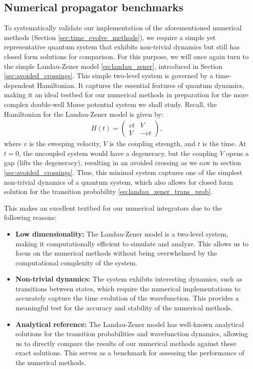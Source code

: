 \documentclass{subfiles}
\begin{document}
\subsection{Numerical propagator benchmarks}
To systematically validate our implementation of the aforementioned numerical methods (Section \ref{sec:time_evolve_methods}), we require a simple yet representative quantum system that exhibits non-trivial dynamics but still has closed form solutions for comparison. For this purpose, we will once again turn to the simple Landau-Zener model \eqref{eq:landau_zener}, introduced in Section \ref{sec:avoided_crossings}. This simple two-level system is governed by a time-dependent Hamiltonian. It captures the essential features of quantum dynamics, making it an ideal testbed for our numerical methods in preparation for the more complex double-well Morse potential system we shall study.
Recall, the Hamiltonian for the Landau-Zener model is given by:
\begin{align*}
    H(t) = \begin{pmatrix}
        vt & V \\
        V & -vt
\end{pmatrix},
\end{align*}
where $v$ is the sweeping velocity, $V$ is the coupling strength, and $t$ is the time. At $t=0$, the uncoupled system would have a degeneracy, but the coupling $V$ opens a gap (lifts the degeneracy), resulting in an avoided crossing as we saw in section \ref{sec:avoided_crossings}. Thus, this minimal system captures one of the simplest non-trivial dynamics of a quantum system, which also allows for closed form solution for the transition probability \eqref{eq:landau_zener_trans_prob}. 

This makes an excellent textbed for our numerical integrators due to the following reasons:
\begin{itemize}
    \item \textbf{Low dimensionality:} The Landau-Zener model is a two-level system, making it computationally efficient to simulate and analyze. This allows us to focus on the numerical methods without being overwhelmed by the computational complexity of the system.
    \item \textbf{Non-trivial dynamics:} The system exhibits interesting dynamics, such as transitions between states, which require the numerical implementations to accurately capture the time evolution of the wavefunction. This provides a meaningful test for the accuracy and stability of the numerical methods.
    \item \textbf{Analytical reference:} The Landau-Zener model has well-known analytical solutions for the transition probabilities and wavefunction dynamics, allowing us to directly compare the results of our numerical methods against these exact solutions. This serves as a benchmark for assessing the performance of the numerical methods.
\end{itemize}
\end{document}
